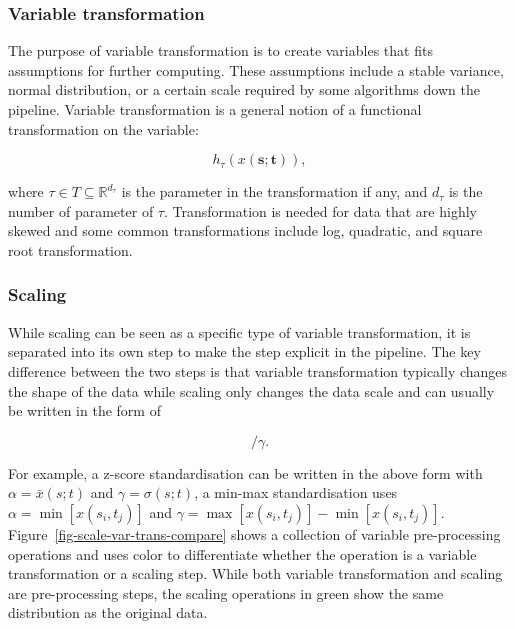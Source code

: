 \documentclass[
]{interact}
\begin{document}
\hypertarget{variable-transformation}{%
\subsubsection{Variable transformation}\label{variable-transformation}}

The purpose of variable transformation is to create variables that fits
assumptions for further computing. These assumptions include a stable
variance, normal distribution, or a certain scale required by some
algorithms down the pipeline. Variable transformation is a general
notion of a functional transformation on the variable:

\begin{equation}
h_{\tau}(x(\mathbf{s};\mathbf{t})),
\end{equation}

where \(\tau \in T \subseteq \mathbb{R}^{d_{\tau}}\) is the parameter in
the transformation if any, and \(d_{\tau}\) is the number of parameter
of \(\tau\). Transformation is needed for data that are highly skewed
and some common transformations include log, quadratic, and square root
transformation.

\hypertarget{scaling}{%
\subsubsection{Scaling}\label{scaling}}

While scaling can be seen as a specific type of variable transformation,
it is separated into its own step to make the step explicit in the
pipeline. The key difference between the two steps is that variable
transformation typically changes the shape of the data while scaling
only changes the data scale and can usually be written in the form of

\begin{equation}
[x(s_i;t_j) - \alpha]/\gamma.
\end{equation}

For example, a z-score standardisation can be written in the above form
with \(\alpha = \bar{x}(s; t)\) and \(\gamma = \sigma(s; t)\), a min-max
standardisation uses \(\alpha = \min[x(s_i, t_j)]\) and
\(\gamma = \max[x(s_i, t_j)] - \min[x(s_i, t_j)]\).
Figure~\ref{fig-scale-var-trans-compare} shows a collection of variable
pre-processing operations and uses color to differentiate whether the
operation is a variable transformation or a scaling step. While both
variable transformation and scaling are pre-processing steps, the
scaling operations in green show the same distribution as the original
data.
\end{document}
